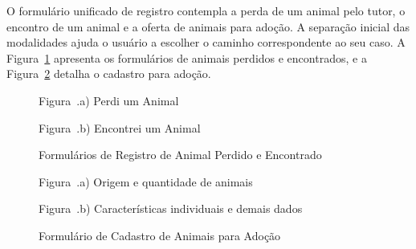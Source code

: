 O formulário unificado de registro contempla a perda de um animal pelo tutor, o encontro de um animal e a oferta de animais para adoção. A separação inicial das modalidades ajuda o usuário a escolher o caminho correspondente ao seu caso. A Figura~\ref{fig:tela_registro_perdi_encontrei} apresenta os formulários de animais perdidos e encontrados, e a Figura~\ref{fig:tela_registro_adocao} detalha o cadastro para adoção.

\begin{figure}[H]
    \centering
    \caption{Formulários de Registro de Animal Perdido e Encontrado}
    \label{fig:tela_registro_perdi_encontrei}
    \vspace{0.15cm}
    \begin{minipage}[t]{0.46\textwidth}
        \centering
        \par\vspace{0.12cm}
        {\small Figura~\thefigure.a) Perdi um Animal}
    \end{minipage}
    \hfill
    \begin{minipage}[t]{0.46\textwidth}
        \centering
        \par\vspace{0.12cm}
        {\small Figura~\thefigure.b) Encontrei um Animal}
    \end{minipage}
    \par\vspace{0.12cm}
\end{figure}

\begin{figure}[H]
    \centering
    \caption{Formulário de Cadastro de Animais para Adoção}
    \label{fig:tela_registro_adocao}
    \vspace{0.15cm}
    \begin{minipage}[t]{0.46\textwidth}
        \centering
        \par\vspace{0.12cm}
        {\small Figura~\thefigure.a) Origem e quantidade de animais}
    \end{minipage}
    \hfill
    \begin{minipage}[t]{0.46\textwidth}
        \centering
        \par\vspace{0.12cm}
        {\small Figura~\thefigure.b) Características individuais e demais dados}
    \end{minipage}
    \par\vspace{0.12cm}
\end{figure}

